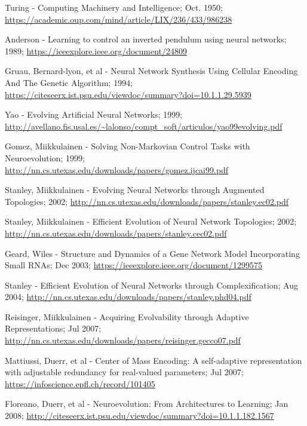 \documentclass[journal, a4paper]{IEEEtran}
\begin{document}
\begin{thebibliography}{5}

    Turing - Computing Machinery and Intelligence; Oct. 1950;
    \url{https://academic.oup.com/mind/article/LIX/236/433/986238}

    Anderson - Learning to control an inverted pendulum using neural networks; 1989;
    \url{https://ieeexplore.ieee.org/document/24809}

    Gruau, Bernard-lyon, et al - Neural Network Synthesis Using Cellular Encoding And The Genetic Algorithm; 1994;
    \url{https://citeseerx.ist.psu.edu/viewdoc/summary?doi=10.1.1.29.5939}

    Yao - Evolving Artificial Neural Networks; 1999;
    \url{http://avellano.fis.usal.es/~lalonso/compt_soft/articulos/yao99evolving.pdf}

    Gomez, Miikkulainen - Solving Non-Markovian Control Tasks with Neuroevolution; 1999;
    \url{http://nn.cs.utexas.edu/downloads/papers/gomez.ijcai99.pdf}

    Stanley, Miikkulainen - Evolving Neural Networks through Augmented Topologies; 2002;
    \url{http://nn.cs.utexas.edu/downloads/papers/stanley.ec02.pdf}

    Stanley, Miikkulainen - Efficient Evolution of Neural Network Topologies; 2002;
    \url{http://nn.cs.utexas.edu/downloads/papers/stanley.cec02.pdf}

    Geard, Wiles - Structure and Dynamics of a Gene Network Model Incorporating Small RNAs; Dec 2003;
    \url{https://ieeexplore.ieee.org/document/1299575}

    Stanley - Efficient Evolution of Neural Networks through Complexification; Aug 2004;
    \url{http://nn.cs.utexas.edu/downloads/papers/stanley.phd04.pdf}

    Reisinger, Miikkulainen - Acquiring Evolvability through Adaptive Representations; Jul 2007;
    \url{http://nn.cs.utexas.edu/downloads/papers/reisinger.gecco07.pdf}

    Mattiussi, Duerr, et al - Center of Mass Encoding: A self-adaptive representation with adjustable redundancy for real-valued parameters; Jul 2007;
    \url{https://infoscience.epfl.ch/record/101405}

    Floreano, Duerr, et al - Neuroevolution: From Architectures to Learning; Jan 2008;
    \url{http://citeseerx.ist.psu.edu/viewdoc/summary?doi=10.1.1.182.1567}


\end{thebibliography}
\end{document}

